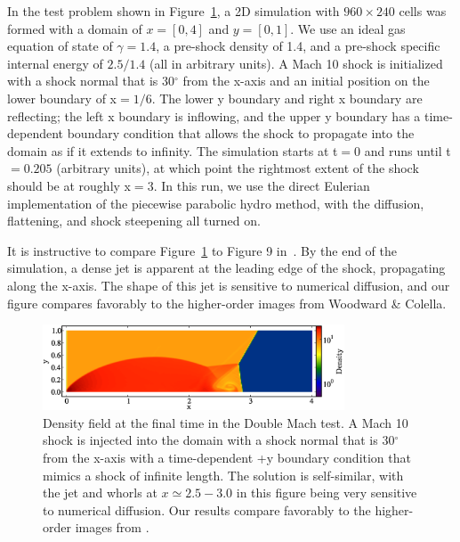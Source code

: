 In the test problem shown in Figure~\ref{fig.doublemach}, a 2D
simulation with $960 \times 240$ cells was formed with a domain of $x
= [0, 4]$ and $y = [0, 1]$.  We use an ideal gas equation of state of
$\gamma = 1.4$, a pre-shock density of 1.4, and a pre-shock specific
internal energy of $2.5/1.4$ (all in arbitrary units).  A Mach 10
shock is initialized with a shock normal that is 30$^\circ$ from the
x-axis and an initial position on the lower boundary of x$ = 1/6$.
The lower y boundary and right x boundary are reflecting; the left x
boundary is inflowing, and the upper y boundary has a time-dependent
boundary condition that allows the shock to propagate into the domain
as if it extends to infinity.  The simulation starts at t$ = 0$ and
runs until t$ = 0.205$ (arbitrary units), at which point the rightmost
extent of the shock should be at roughly x$ = 3$.  In this run, we use
the direct Eulerian implementation of the piecewise parabolic hydro
method, with the diffusion, flattening, and shock steepening all
turned on.

It is instructive to compare Figure~\ref{fig.doublemach} to Figure 9
in~\citet{1984JCoPh..54..115W}.  By the end of the simulation, a dense
jet is apparent at the leading edge of the shock, propagating along
the x-axis.  The shape of this jet is sensitive to numerical
diffusion, and our figure compares favorably to the higher-order
images from Woodward \& Colella.

\begin{figure}
\begin{center}
\includegraphics[width=0.8\textwidth]{figures/DoubleMachTest.eps}
\caption{Density field at the final time in the Double Mach test.  A
Mach 10 shock is injected into the domain with a shock normal that is
30$^\circ$ from the x-axis with a time-dependent +y boundary condition
that mimics a shock of infinite length.  The solution is self-similar,
with the jet and whorls at $x \simeq 2.5-3.0$ in this figure being very sensitive
to numerical diffusion.  Our results compare favorably to the
higher-order images from \citet{1984JCoPh..54..115W}.}
\label{fig.doublemach}
\end{center}
\end{figure}


